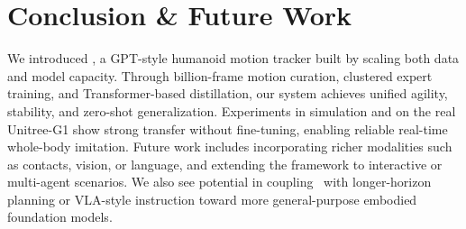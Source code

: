 \section{Conclusion \& Future Work}
\label{sec:conclusion}

We introduced \methodname, a GPT-style humanoid motion tracker built by scaling both data and model capacity. Through billion-frame motion curation, clustered expert training, and Transformer-based distillation, our system achieves unified agility, stability, and zero-shot generalization. Experiments in simulation and on the real Unitree-G1 show strong transfer without fine-tuning, enabling reliable real-time whole-body imitation.
Future work includes incorporating richer modalities such as contacts, vision, or language, and extending the framework to interactive or multi-agent scenarios. We also see potential in coupling \methodname\ with longer-horizon planning or VLA-style instruction toward more general-purpose embodied foundation models.

